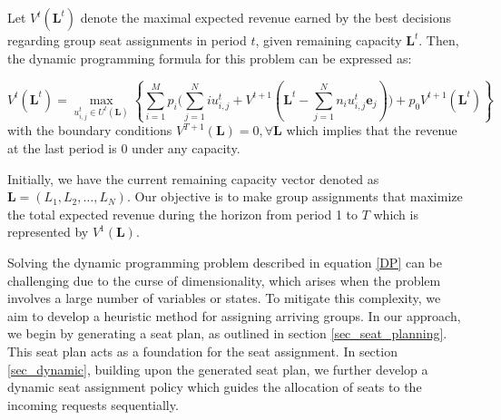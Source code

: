 Let $V^{t}(\mathbf{L}^{t})$ denote the maximal expected revenue earned by the best decisions regarding group seat assignments in period $t$, given remaining capacity $\mathbf{L}^{t}$. Then, the dynamic programming formula for this problem can be expressed as:

\begin{equation}\label{DP}
V^{t}(\mathbf{L}^{t}) = \max_{u_{i,j}^{t} \in U^{t}(\mathbf{L})}\left\{ \sum_{i=1}^{M} p_i \bigl( \sum_{j=1}^{N} i u_{i,j}^{t} + V^{t+1}(\mathbf{L}^{t}- \sum_{j=1}^{N} n_i u_{i,j}^{t}\mathbf{e}_j)\bigr) + p_0 V^{t+1}(\mathbf{L}^{t})\right\}
\end{equation}
with the boundary conditions $V^{T+1}(\mathbf{L}) = 0, \forall \mathbf{L}$ which implies that the revenue at the last period is 0 under any capacity.

Initially, we have the current remaining capacity vector denoted as $\mathbf{L} = (L_1, L_2, \ldots, L_N)$. Our objective is to make group assignments that maximize the total expected revenue during the horizon from period 1 to $T$ which is represented by $V^{1}(\mathbf{L})$.

Solving the dynamic programming problem described in equation \eqref{DP} can be challenging due to the curse of dimensionality, which arises when the problem involves a large number of variables or states. To mitigate this complexity, we aim to develop a heuristic method for assigning arriving groups. In our approach, we begin by generating a seat plan, as outlined in section \ref{sec_seat_planning}. This seat plan acts as a foundation for the seat assignment. In section \ref{sec_dynamic}, building upon the generated seat plan, we further develop a dynamic seat assignment policy which guides the allocation of seats to the incoming requests sequentially. 



